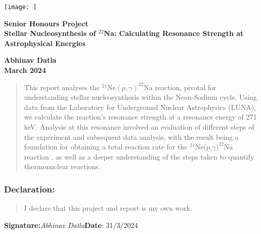 \documentclass[a4paper,12pt]{article}
\def\reac{$^{21}$Ne(p,$\gamma)^{22}$Na reaction }
\begin{document}
\pagestyle{empty}                       %

\par\noindent\texttt{[image: ]}

\par\noindent                                           %
\vspace*{1cm}
\begin{center}
        \bf Senior Honours Project\\
        \Large\bf Stellar Nucleosynthesis of $^{22}$Na: Calculating Resonance Strength at Astrophysical Energies          %
\end{center}
\vspace*{0.5cm}
\begin{center}
        \bf Abhinav Datla\\                               %
        March 2024                                   %
\end{center}
\vspace*{5mm}
%
\begin{abstract}
This report analyses the \( ^{21}\text{Ne}(p,\gamma)^{22}\text{Na}\) reaction, pivotal for understanding stellar nucleosynthesis within the Neon-Sodium cycle. Using data from the Laboratory for Underground Nuclear Astrophysics (LUNA), we calculate the reaction's resonance strength at a resonance energy of 271 keV. Analysis at this resonance involved an evaluation of different steps of the experiment and subsequent data analysis, with the result being a foundation for obtaining a total reaction rate for the \reac, as well as a deeper understanding of the steps taken to quantify thermonuclear reactions.
\end{abstract}

\vspace*{1cm}

\subsubsection*{Declaration:}

\begin{quotation}
  I declare that this project and report is my own work.
\end{quotation}

\vspace*{2cm}
{\bf{Signature:}}\textit{Abhinav Datla}\hspace*{8cm}\textbf{Date}:  31/3/2024         %
\end{document}
